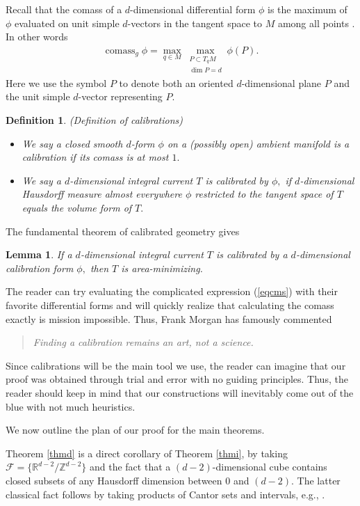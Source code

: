 \documentclass[11pt,a4paper]{amsart}
\numberwithin{equation}{section}
\newcommand{\mff}{\mathcal{F}}
\newcommand{\cms}{\operatorname{comass}}
\newcommand{\s}{\subset}
\newcommand{\R}{\mathbb{R}}
\newcommand{\Z}{\mathbb{Z}}
\theoremstyle{plain}
\newtheorem{lem}[exam]{Lemma}
\newtheorem{defn}[exam]{Definition}
\theoremstyle{definition}
\numberwithin{equation}{subsection}
\begin{document}
	Recall that the comass of a  $d$-dimensional differential form  $\phi$ is the maximum of $\phi$ evaluated on unit simple $d$-vectors in the tangent space to $M$ among all  points \cite[Section 1.8]{HF}. In other words
	\begin{align}\label{eqcms}
		\cms_g\phi=\max_{q\in M}\max_{\substack{P\s T_qM\\ \dim P=d}}\phi(P).
	\end{align}
	Here we use the symbol $P$ to denote both an oriented $d$-dimensional plane $P$ and the unit simple $d$-vector representing $P.$
	\begin{defn}(Definition of calibrations)\label{defncal}
		\begin{itemize}
			\item 	We say a closed smooth $d$-form $\phi$ on a (possibly open) ambient manifold is a calibration if its comass is at most $1.$ 
			\item 
			We say a $d$-dimensional integral current $T$ is calibrated by $\phi,$ if $d$-dimensional Hausdorff measure almost everywhere $\phi$ restricted to the tangent space of $T$ equals the volume form of $T.$
		\end{itemize}
	\end{defn}
The fundamental theorem of calibrated geometry \cite[Theorem 4.2]{HL} gives	\begin{lem}\label{fcal}
		If a $d$-dimensional integral current $T$ is calibrated by a $d$-dimensional calibration form $\phi,$ then $T$ is area-minimizing.
		\end{lem}
The reader can try evaluating the complicated expression (\ref{eqcms}) with their favorite differential forms and will quickly realize that calculating the comass exactly is mission impossible. Thus, Frank Morgan has famously commented \cite[p. 343]{FMct}
\begin{quote}
\emph{Finding a calibration remains an art, not a science.}
\end{quote}

Since calibrations will be the main tool we use, the reader can imagine that our proof was obtained through trial and error with no guiding principles. Thus, the reader should keep in mind that our constructions will inevitably come out of the blue with not much heuristics.


We now outline the plan of our proof for the main theorems.
	
	Theorem \ref{thmd} is a direct corollary of Theorem \ref{thmi}, by taking $\mff=\{\R^{d-2}/\Z^{d-2}\}$ and the fact that a $(d-2)$-dimensional cube contains closed subsets of any Hausdorff dimension between $0$ and $(d-2).$ The latter classical fact follows by taking products of Cantor sets and intervals, e.g., \cite[Section 4.10 and Theorem 8.10]{PM}.
	
\end{document}
